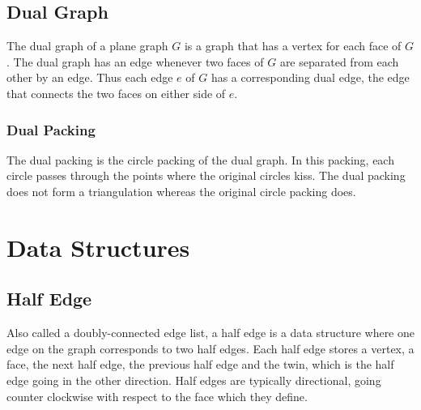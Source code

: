 \documentclass{article}
\begin{document}
\subsection{Dual Graph}
The dual graph of a plane graph $G$ is a graph that has a vertex for each face of $G$. The dual graph has an edge whenever two faces of $G$ are separated from each other by an edge. Thus each edge $e$ of $G$ has a corresponding dual edge, the edge that connects the two faces on either side of $e$. 
\subsubsection{Dual Packing}
The dual packing is the circle packing of the dual graph. In this packing, each circle passes through the points where the original circles kiss. The dual packing does not form a triangulation whereas the original circle packing does.
\section{Data Structures}
\subsection{Half Edge}
Also called a doubly-connected edge list, a half edge is a data structure where one edge on the graph corresponds to two half edges. Each half edge stores a vertex, a face, the next half edge, the previous half edge and the twin, which is the half edge going in the other direction. Half edges are typically directional, going counter clockwise with respect to the face which they define.


\end{document}
